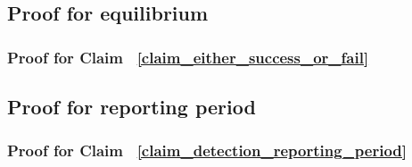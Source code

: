 \documentclass[12pt]{article}
\theoremstyle{remark}
\theoremstyle{remark}
\begin{document}
\subsection{Proof for equilibrium}

\subsubsection{Proof for Claim ~\ref{claim_either_success_or_fail}}


\subsection{Proof for reporting period}


\subsubsection{Proof for Claim ~\ref{claim_detection_reporting_period}}
\end{document}
